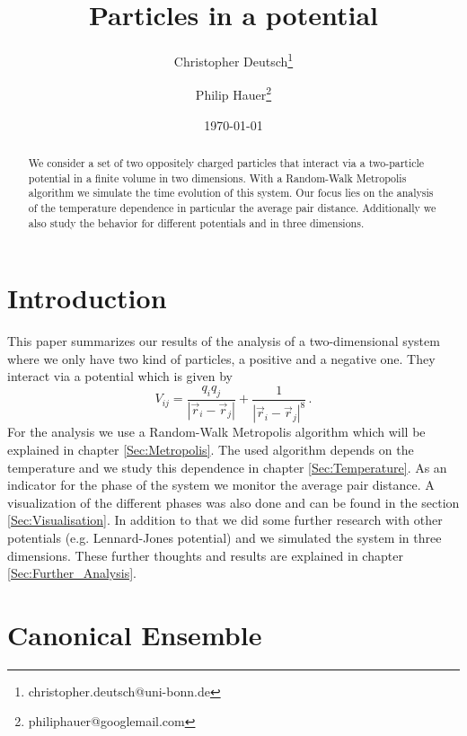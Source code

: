 \documentclass[11pt, a4paper]{article}
\title{Particles in a potential}
\author{Christopher Deutsch\footnote{christopher.deutsch@uni-bonn.de} \and Philip Hauer\footnote{philiphauer@googlemail.com}}
\date{\today}
\numberwithin{equation}{section}
\begin{document}
\begin{titlepage}

\maketitle

\begin{abstract}
\noindent 
We consider a set of two oppositely charged particles that interact via a two-particle potential in a finite volume in two dimensions. With a Random-Walk Metropolis algorithm we simulate the time evolution of this system. Our focus lies on the analysis of the temperature dependence in particular the average pair distance. Additionally we also study the behavior for different potentials and in three dimensions.
\end{abstract}

\end{titlepage}

\tableofcontents
\newpage


\section{Introduction}
This paper summarizes our results of the analysis of a two-dimensional system where we only have two kind of particles, a positive and a negative one. They interact via a potential which is given by
\begin{equation}
V_{ij} = \frac{q_i q_j}{\left| \vec{r}_i - \vec{r}_j \right|} + \frac{1}{\left| \vec{r}_i - \vec{r}_j \right|^8} \, .
\end{equation}
For the analysis we use a Random-Walk Metropolis algorithm which will be explained in chapter \ref{Sec:Metropolis}. The used algorithm depends on the temperature and we study this dependence in chapter \ref{Sec:Temperature}. As an indicator for the phase of the system we monitor the average pair distance. A visualization of the different phases was also done and can be found in the section \ref{Sec:Visualisation}. In addition to that we did some further research with other potentials (e.g. Lennard-Jones potential) and we simulated the system in three dimensions. These further thoughts and results are explained in chapter \ref{Sec:Further_Analysis}.

\section{Canonical Ensemble} \label{Sec:Canonical_Ensemble}
\end{document}
